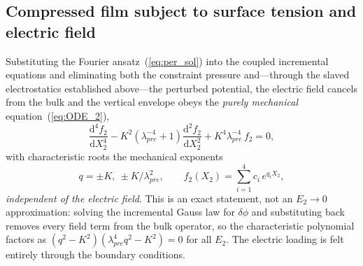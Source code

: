 \documentclass[final,3p,times]{elsarticle}
\begin{document}
\subsection{Compressed film subject to surface tension and electric field}

Substituting the Fourier ansatz~(\ref{eq:per_sol}) into the coupled incremental equations and eliminating both the constraint pressure and---through the slaved electrostatics established above---the perturbed potential, the electric field cancels from the bulk and the vertical envelope obeys the \emph{purely mechanical} equation~(\ref{eq:ODE_2}),
\begin{equation}
	\frac{\mathrm{d}^4 f_2}{\mathrm{d}X_2^4} - K^2\!\left(\lambda_{pre}^{-4}+1\right)\frac{\mathrm{d}^2 f_2}{\mathrm{d}X_2^2} + K^4\lambda_{pre}^{-4}\, f_2 = 0 ,
	\label{eq:ODE_3}
\end{equation}
with characteristic roots the mechanical exponents
\begin{equation}
	q=\pm K,\ \pm K/\lambda_{pre}^{2},
	\qquad
	f_2(X_2)=\sum_{i=1}^{4}c_i\,e^{q_i X_2},
	\label{eq:elec_roots}
\end{equation}
\emph{independent of the electric field}. This is an exact statement, not an $E_2\to0$ approximation: solving the incremental Gauss law for $\delta\phi$ and substituting back removes every field term from the bulk operator, so the characteristic polynomial factors as $(q^2-K^2)(\lambda_{pre}^{4}q^2-K^2)=0$ for all $E_2$. The electric loading is felt entirely through the boundary conditions.
\end{document}
